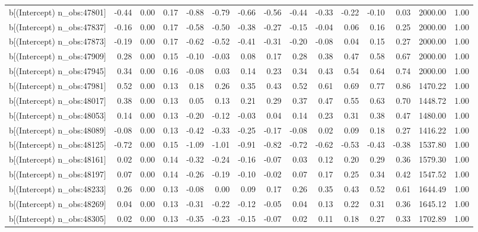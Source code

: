 \begin{table}[ht]
\begin{tabular}{rrrrrrrrrrrrrrr}
  b[(Intercept) n\_obs:47801] & -0.44 & 0.00 & 0.17 & -0.88 & -0.79 & -0.66 & -0.56 & -0.44 & -0.33 & -0.22 & -0.10 & 0.03 & 2000.00 & 1.00 \\ 
  b[(Intercept) n\_obs:47837] & -0.16 & 0.00 & 0.17 & -0.58 & -0.50 & -0.38 & -0.27 & -0.15 & -0.04 & 0.06 & 0.16 & 0.25 & 2000.00 & 1.00 \\ 
  b[(Intercept) n\_obs:47873] & -0.19 & 0.00 & 0.17 & -0.62 & -0.52 & -0.41 & -0.31 & -0.20 & -0.08 & 0.04 & 0.15 & 0.27 & 2000.00 & 1.00 \\ 
  b[(Intercept) n\_obs:47909] & 0.28 & 0.00 & 0.15 & -0.10 & -0.03 & 0.08 & 0.17 & 0.28 & 0.38 & 0.47 & 0.58 & 0.67 & 2000.00 & 1.00 \\ 
  b[(Intercept) n\_obs:47945] & 0.34 & 0.00 & 0.16 & -0.08 & 0.03 & 0.14 & 0.23 & 0.34 & 0.43 & 0.54 & 0.64 & 0.74 & 2000.00 & 1.00 \\ 
  b[(Intercept) n\_obs:47981] & 0.52 & 0.00 & 0.13 & 0.18 & 0.26 & 0.35 & 0.43 & 0.52 & 0.61 & 0.69 & 0.77 & 0.86 & 1470.22 & 1.00 \\ 
  b[(Intercept) n\_obs:48017] & 0.38 & 0.00 & 0.13 & 0.05 & 0.13 & 0.21 & 0.29 & 0.37 & 0.47 & 0.55 & 0.63 & 0.70 & 1448.72 & 1.00 \\ 
  b[(Intercept) n\_obs:48053] & 0.14 & 0.00 & 0.13 & -0.20 & -0.12 & -0.03 & 0.04 & 0.14 & 0.23 & 0.31 & 0.38 & 0.47 & 1480.00 & 1.00 \\ 
  b[(Intercept) n\_obs:48089] & -0.08 & 0.00 & 0.13 & -0.42 & -0.33 & -0.25 & -0.17 & -0.08 & 0.02 & 0.09 & 0.18 & 0.27 & 1416.22 & 1.00 \\ 
  b[(Intercept) n\_obs:48125] & -0.72 & 0.00 & 0.15 & -1.09 & -1.01 & -0.91 & -0.82 & -0.72 & -0.62 & -0.53 & -0.43 & -0.38 & 1537.80 & 1.00 \\ 
  b[(Intercept) n\_obs:48161] & 0.02 & 0.00 & 0.14 & -0.32 & -0.24 & -0.16 & -0.07 & 0.03 & 0.12 & 0.20 & 0.29 & 0.36 & 1579.30 & 1.00 \\ 
  b[(Intercept) n\_obs:48197] & 0.07 & 0.00 & 0.14 & -0.26 & -0.19 & -0.10 & -0.02 & 0.07 & 0.17 & 0.25 & 0.34 & 0.42 & 1547.52 & 1.00 \\ 
  b[(Intercept) n\_obs:48233] & 0.26 & 0.00 & 0.13 & -0.08 & 0.00 & 0.09 & 0.17 & 0.26 & 0.35 & 0.43 & 0.52 & 0.61 & 1644.49 & 1.00 \\ 
  b[(Intercept) n\_obs:48269] & 0.04 & 0.00 & 0.13 & -0.31 & -0.22 & -0.12 & -0.05 & 0.04 & 0.13 & 0.22 & 0.31 & 0.36 & 1645.12 & 1.00 \\ 
  b[(Intercept) n\_obs:48305] & 0.02 & 0.00 & 0.13 & -0.35 & -0.23 & -0.15 & -0.07 & 0.02 & 0.11 & 0.18 & 0.27 & 0.33 & 1702.89 & 1.00 \\ 

\end{tabular}
\end{table}
